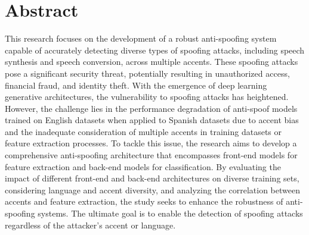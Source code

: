
\chapter{Abstract}

This research focuses on the development of a robust anti-spoofing system capable of accurately detecting diverse types of spoofing attacks, including speech synthesis and speech conversion, across multiple accents. These spoofing attacks pose a significant security threat, potentially resulting in unauthorized access, financial fraud, and identity theft. With the emergence of deep learning generative architectures, the vulnerability to spoofing attacks has heightened. However, the challenge lies in the performance degradation of anti-spoof models trained on English datasets when applied to Spanish datasets due to accent bias and the inadequate consideration of multiple accents in training datasets or feature extraction processes. To tackle this issue, the research aims to develop a comprehensive anti-spoofing architecture that encompasses front-end models for feature extraction and back-end models for classification. By evaluating the impact of different front-end and back-end architectures on diverse training sets, considering language and accent diversity, and analyzing the correlation between accents and feature extraction, the study seeks to enhance the robustness of anti-spoofing systems. The ultimate goal is to enable the detection of spoofing attacks regardless of the attacker's accent or language.


